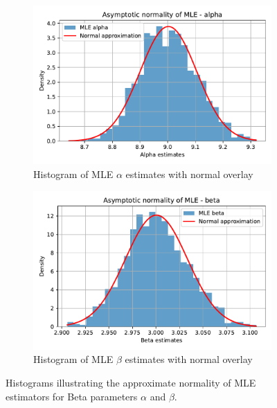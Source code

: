 \begin{figure}[H]
    \centering
    \begin{subfigure}[b]{0.48\textwidth}
        \centering
        \includegraphics[width=\textwidth]{resources/figures/q11c-alpha_mle_histogram.pdf}
        \caption{Histogram of MLE \(\alpha\) estimates with normal overlay}
        \label{fig:mle_alpha_hist}
    \end{subfigure}
    \hfill
    \begin{subfigure}[b]{0.48\textwidth}
        \centering
        \includegraphics[width=\textwidth]{resources/figures/q11c-beta_mle_histogram.pdf}
        \caption{Histogram of MLE \(\beta\) estimates with normal overlay}
        \label{fig:mle_beta_hist}
    \end{subfigure}
    \caption{Histograms illustrating the approximate normality of MLE estimators for Beta parameters \(\alpha\) and \(\beta\).}
    \label{fig:mle_histograms}
\end{figure}

